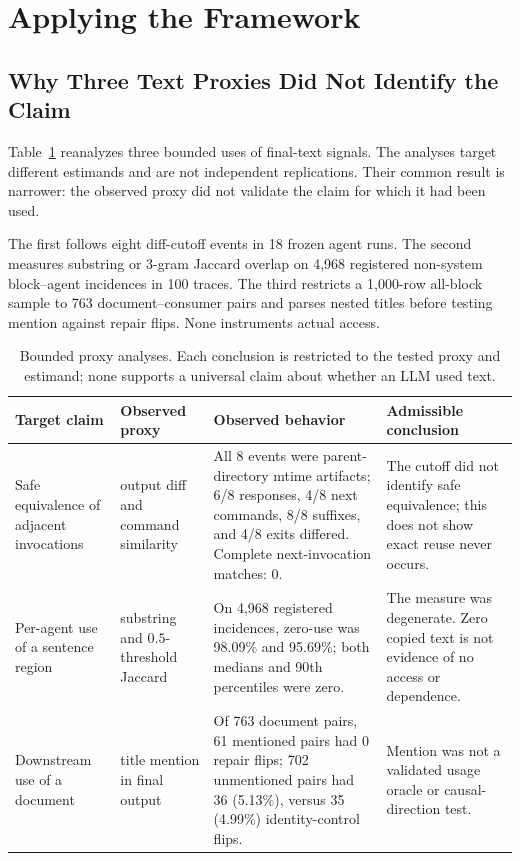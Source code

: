 \documentclass[letterpaper]{article} %
\begin{document}
\section{Applying the Framework}

\subsection{Why Three Text Proxies Did Not Identify the Claim}

Table~\ref{tab:proxies} reanalyzes three bounded uses of final-text signals.
The analyses target different estimands and are not independent replications.
Their common result is narrower: the observed proxy did not validate the
claim for which it had been used.

The first follows eight diff-cutoff events in 18 frozen agent runs. The second
measures substring or 3-gram Jaccard overlap on 4,968 registered non-system
block--agent incidences in 100 traces. The third restricts a 1,000-row
all-block sample to 763 document--consumer pairs and parses nested titles
before testing mention against repair flips. None instruments actual access.

\begin{table}[t]
\centering
\small
\setlength{\tabcolsep}{4pt}
\begin{tabular}{p{}p{}p{}p{}}
\toprule
\textbf{Target claim} & \textbf{Observed proxy} & \textbf{Observed behavior} & \textbf{Admissible conclusion} \\
\midrule
Safe equivalence of adjacent invocations & output diff and command similarity & All 8 events were parent-directory mtime artifacts; 6/8 responses, 4/8 next commands, 8/8 suffixes, and 4/8 exits differed. Complete next-invocation matches: 0. & The cutoff did not identify safe equivalence; this does not show exact reuse never occurs. \\
Per-agent use of a sentence region & substring and $0.5$-threshold Jaccard & On 4,968 registered incidences, zero-use was 98.09\% and 95.69\%; both medians and 90th percentiles were zero. & The measure was degenerate. Zero copied text is not evidence of no access or dependence. \\
Downstream use of a document & title mention in final output & Of 763 document pairs, 61 mentioned pairs had 0 repair flips; 702 unmentioned pairs had 36 (5.13\%), versus 35 (4.99\%) identity-control flips. & Mention was not a validated usage oracle or causal-direction test. \\
\bottomrule
\end{tabular}
\caption{Bounded proxy analyses. Each conclusion is restricted to the tested
proxy and estimand; none supports a universal claim about whether an LLM used
text.}
\label{tab:proxies}
\end{table}
\end{document}
